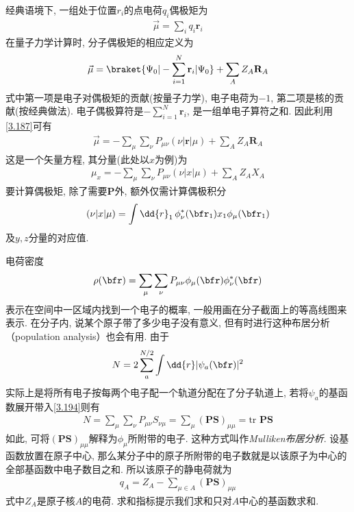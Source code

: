 经典语境下, 一组处于位置$r_i$的点电荷$q_i$偶极矩为
\begin{align}
	\vec{\mu} = \sum_i q_i\mathbf{r}_i
\end{align}
在量子力学计算时, 分子偶极矩的相应定义为
\begin{align}
	\vec{\mu} = \braket{\Psi_0|-\sum_{i=1}^{N}\mathbf{r}_i|\Psi_0} + \sum_AZ_A\mathbf{R}_A
\end{align}
式中第一项是电子对偶极矩的贡献(按量子力学), 
电子电荷为$-1$, 
第二项是核的贡献(按经典做法). 
电子偶极算符是$-\sum_{i=1}^{N}\mathbf{r}_i$, 
是一组单电子算符之和. 
因此利用\autoref{3.187}可有
\begin{align}
	\vec{\mu} = -\sum_\mu\sum_\nu P_{\mu\nu}(\nu|\mathbf{r}|\mu) + \sum_AZ_A\mathbf{R}_A
\end{align}
这是一个矢量方程, 
其分量(此处以$x$为例)为
\begin{align}
	\mu_x = -\sum_\mu\sum_\nu P_{\mu\nu}(\nu|x|\mu) + \sum_AZ_AX_A
\end{align}
要计算偶极矩, 
除了需要$\mathbf{P}$外, 
额外仅需计算偶极积分
\begin{align}
	(\nu|x|\mu) = \int\dd{r}_1\,\phi_\nu^*(\bfr_1)x_1\phi_\mu(\bfr_1)
\end{align}
及$y,z$分量的对应值.


电荷密度
\begin{align}
	\rho(\bfr) = \sum_\mu\sum_\nu P_{\mu\nu}\phi_\mu(\bfr)\phi_\nu^*(\bfr)
\end{align}
表示在空间中一区域内找到一个电子的概率, 一般用画在分子截面上的等高线图来表示. 
在分子内, 说某个原子带了多少电子没有意义, 但有时进行这种布居分析（population analysis）也会有用. 由于
\begin{align}
	\label{3.194}
	N = 2\sum_{a}^{N/2}\int\dd{r}|\psi_a(\bfr)|^2
\end{align}
实际上是将所有电子按每两个电子配一个轨道分配在了分子轨道上, 
若将$\psi_a$的基函数展开带入\autoref{3.194}则有
\begin{align}
	\label{3.195}
	N = \sum_\mu\sum_\nu P_{\mu\nu}S_{\nu\mu} = \sum_\mu(\mathbf{PS})_{\mu\mu} = \mathrm{tr}\,\,\mathbf{PS}
\end{align}
如此, 
可将$(\mathbf{PS})_{\mu\mu}$解释为$\phi_\mu$所附带的电子. 
这种方式叫作\emph{Mulliken布居分析}. 
设基函数放置在原子中心, 
那么某分子中的原子所附带的电子数就是以该原子为中心的全部基函数中电子数目之和. 
所以该原子的静电荷就为
\begin{align}
	q_A = Z_A - \sum_{\mu\in A}(\mathbf{PS})_{\mu\mu}
\end{align}
式中$Z_A$是原子核$A$的电荷. 
求和指标提示我们求和只对$A$中心的基函数求和.


